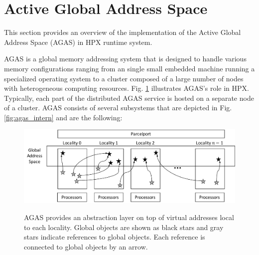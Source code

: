 \section{Active Global Address Space}
\label{agas}

This section provides an overview of the implementation of the Active Global
Address Space (AGAS) in HPX runtime system.

AGAS is a global memory addressing system that is designed to
handle various memory configurations ranging from an single small embedded
machine running a specialized operating system to a cluster composed of
a large number of nodes with heterogeneous computing resources. Fig.
\ref{fig:agas_struct} illustrates AGAS's role in HPX. Typically, 
each part of the distributed AGAS service is hosted on a separate node of a
cluster. AGAS consists of several subsystems that are depicted in Fig.
\ref{fig:agas_intern} and are the following:

\begin{figure}[h]
    \centering
    \caption{AGAS provides an abstraction layer on top of virtual addresses local to each locality. Global objects are shown as black stars and gray stars indicate references to global objects. Each reference is connected to global objects by an arrow.}
    \includegraphics[width=.49\textwidth,height=\textheight,keepaspectratio]{illustrations/agas_struct}
    \label{fig:agas_struct}
\end{figure}

